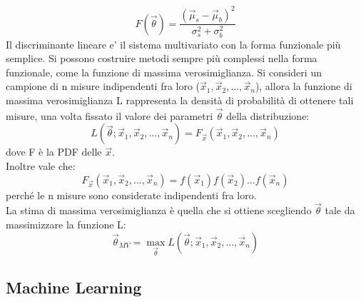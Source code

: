 \begin{equation}
F(\vec{\theta}) = \frac{(\vec\mu_s - \vec\mu_b)^2}{\sigma_s^2 + \sigma_b^2}
\end{equation} 
Il discriminante lineare e' il sistema multivariato con la forma funzionale più semplice. Si possono costruire metodi sempre più complessi nella forma funzionale, come la funzione di massima verosimiglianza. Si consideri un campione di n misure indipendenti fra loro ($\vec{x}_1 , \vec{x}_2 , ... , \vec{x}_n$), allora la funzione di massima verosimiglianza L rappresenta la densità di probabilità di ottenere tali misure, una volta fissato il valore dei parametri $\vec{\theta}$ della distribuzione:
\begin{equation}
	L(\vec{\theta};\vec{x}_1 , \vec{x}_2 , ... , \vec{x}_n) = 
	F_{\vec{x}} (\vec{x}_1 , \vec{x}_2 , ... , \vec{x}_n )
\end{equation}
dove F è la PDF delle $\vec{x}$. \\ 
Inoltre vale che:
\begin{equation}
	F_{\vec{x}} (\vec{x}_1 , \vec{x}_2 , ... , \vec{x}_n ) = f(\vec{x}_1) f (\vec{x}_2) ... f(\vec{x}_n)
\end{equation}
perché le n misure sono considerate indipendenti fra loro. \\
La stima di massima verosimiglianza è quella che si ottiene scegliendo $\vec{\theta}$ tale da massimizzare la funzione L:
\begin{equation}
	\vec{\theta}_{MV} = \max_{\vec{\theta}} L(\vec{\theta};\vec{x}_1 , \vec{x}_2 , ... , \vec{x}_n)
\end{equation}


\newpage


\subsection{Machine Learning}
\label{ML}

